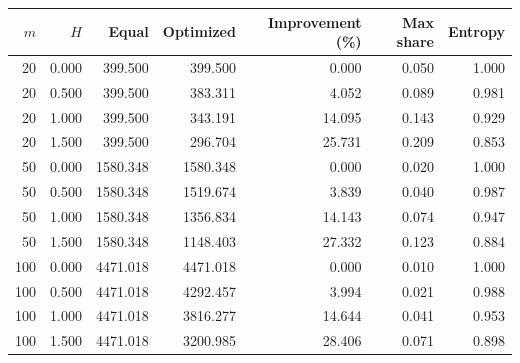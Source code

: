\begin{tabular}{rrrrrrr}
\toprule
$m$ & $H$ & Equal & Optimized & Improvement (\%) & Max share & Entropy \\
\midrule
20 & 0.000 & 399.500 & 399.500 & 0.000 & 0.050 & 1.000 \\
20 & 0.500 & 399.500 & 383.311 & 4.052 & 0.089 & 0.981 \\
20 & 1.000 & 399.500 & 343.191 & 14.095 & 0.143 & 0.929 \\
20 & 1.500 & 399.500 & 296.704 & 25.731 & 0.209 & 0.853 \\
50 & 0.000 & 1580.348 & 1580.348 & 0.000 & 0.020 & 1.000 \\
50 & 0.500 & 1580.348 & 1519.674 & 3.839 & 0.040 & 0.987 \\
50 & 1.000 & 1580.348 & 1356.834 & 14.143 & 0.074 & 0.947 \\
50 & 1.500 & 1580.348 & 1148.403 & 27.332 & 0.123 & 0.884 \\
100 & 0.000 & 4471.018 & 4471.018 & 0.000 & 0.010 & 1.000 \\
100 & 0.500 & 4471.018 & 4292.457 & 3.994 & 0.021 & 0.988 \\
100 & 1.000 & 4471.018 & 3816.277 & 14.644 & 0.041 & 0.953 \\
100 & 1.500 & 4471.018 & 3200.985 & 28.406 & 0.071 & 0.898 \\
\bottomrule
\end{tabular}
